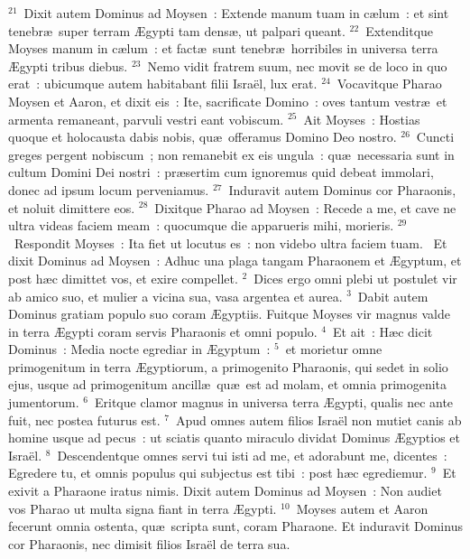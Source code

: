 ${}^{21}$~Dixit autem Dominus ad Moysen~: Extende manum tuam in c\ae lum~: et sint tenebr\ae\ super terram \AE gypti tam dens\ae , ut palpari queant.
${}^{22}$~Extenditque Moyses manum in c\ae lum~: et fact\ae\ sunt tenebr\ae\ horribiles in universa terra \AE gypti tribus diebus.
${}^{23}$~Nemo vidit fratrem suum, nec movit se de loco in quo erat~: ubicumque autem habitabant filii Isra\"el, lux erat.
${}^{24}$~Vocavitque Pharao Moysen et Aaron, et dixit eis~: Ite, sacrificate Domino~: oves tantum vestr\ae\ et armenta remaneant, parvuli vestri eant vobiscum.
${}^{25}$~Ait Moyses~: Hostias quoque et holocausta dabis nobis, qu\ae\ offeramus Domino Deo nostro.
${}^{26}$~Cuncti greges pergent nobiscum~; non remanebit ex eis ungula~: qu\ae\ necessaria sunt in cultum Domini Dei nostri~: pr\ae sertim cum ignoremus quid debeat immolari, donec ad ipsum locum perveniamus.
${}^{27}$~Induravit autem Dominus cor Pharaonis, et noluit dimittere eos.
${}^{28}$~Dixitque Pharao ad Moysen~: Recede a me, et cave ne ultra videas faciem meam~: quocumque die apparueris mihi, morieris.
${}^{29}$~Respondit Moyses~: Ita fiet ut locutus es~: non videbo ultra faciem tuam.
~Et dixit Dominus ad Moysen~: Adhuc una plaga tangam Pharaonem et \AE gyptum, et post h\ae c dimittet vos, et exire compellet.
${}^{2}$~Dices ergo omni plebi ut postulet vir ab amico suo, et mulier a vicina sua, vasa argentea et aurea.
${}^{3}$~Dabit autem Dominus gratiam populo suo coram \AE gyptiis. Fuitque Moyses vir magnus valde in terra \AE gypti coram servis Pharaonis et omni populo.
${}^{4}$~Et ait~: H\ae c dicit Dominus~: Media nocte egrediar in \AE gyptum~:
${}^{5}$~et morietur omne primogenitum in terra \AE gyptiorum, a primogenito Pharaonis, qui sedet in solio ejus, usque ad primogenitum ancill\ae\ qu\ae\ est ad molam, et omnia primogenita jumentorum.
${}^{6}$~Eritque clamor magnus in universa terra \AE gypti, qualis nec ante fuit, nec postea futurus est.
${}^{7}$~Apud omnes autem filios Isra\"el non mutiet canis ab homine usque ad pecus~: ut sciatis quanto miraculo dividat Dominus \AE gyptios et Isra\"el.
${}^{8}$~Descendentque omnes servi tui isti ad me, et adorabunt me, dicentes~: Egredere tu, et omnis populus qui subjectus est tibi~: post h\ae c egrediemur.
${}^{9}$~Et exivit a Pharaone iratus nimis. Dixit autem Dominus ad Moysen~: Non audiet vos Pharao ut multa signa fiant in terra \AE gypti.
${}^{10}$~Moyses autem et Aaron fecerunt omnia ostenta, qu\ae\ scripta sunt, coram Pharaone. Et induravit Dominus cor Pharaonis, nec dimisit filios Isra\"el de terra sua.
